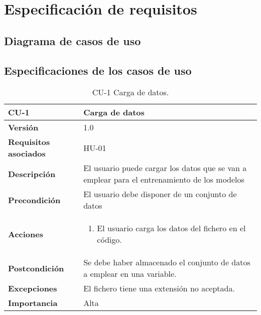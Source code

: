 \section{Especificación de requisitos}

\subsection{Diagrama de casos de uso}


\subsection{Especificaciones de los casos de uso}

\begin{table}[p]
	\centering
	\begin{tabularx}{\linewidth}{ p{} p{} }
		\toprule
		\textbf{CU-1}    & \textbf{Carga de datos}\\
		\toprule
		\textbf{Versión}              & 1.0    \\
		\textbf{Requisitos asociados} & HU-01 \\
		\textbf{Descripción}          & El usuario puede cargar los datos que se van a emplear para el entrenamiento de los modelos \\
		\textbf{Precondición}         & El usuario debe disponer de un conjunto de datos \\
		\textbf{Acciones}             &
		\begin{enumerate}
			\def\labelenumi{\arabic{enumi}.}
			\tightlist
			\item El usuario carga los datos del fichero en el código.
		\end{enumerate}\\
		\textbf{Postcondición}        & Se debe haber almacenado el conjunto de datos a emplear en una variable. \\
		\textbf{Excepciones}          & El fichero tiene una extensión no aceptada. \\
		\textbf{Importancia}          & Alta \\
		\bottomrule
	\end{tabularx}
	\caption{CU-1 Carga de datos.}
\end{table}

